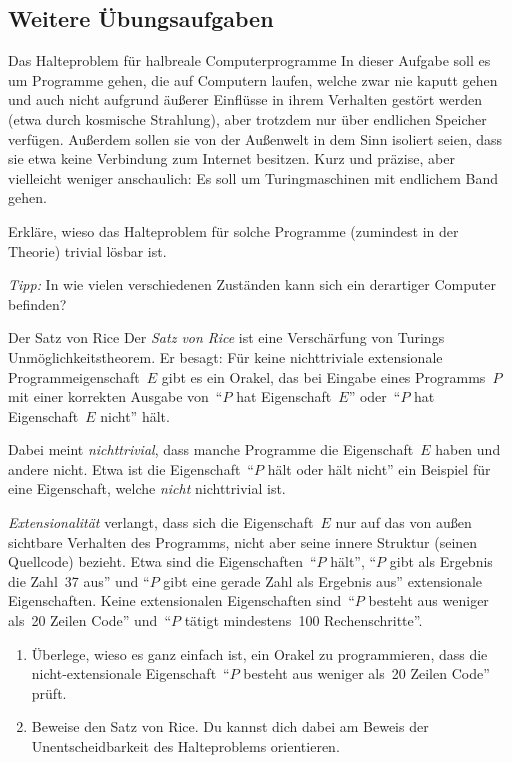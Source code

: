 \documentclass[twoside]{../zirkelblatt1415}
\theoremstyle{definition}
\theoremstyle{plain}
\theoremstyle{remark}
\begin{document}
\subsection{Weitere Übungsaufgaben}

\begin{aufgabe}{Das Halteproblem für halbreale Computerprogramme}
In dieser Aufgabe soll es um Programme gehen, die auf Computern laufen, welche
zwar nie kaputt gehen und auch nicht aufgrund äußerer Einflüsse in ihrem
Verhalten gestört werden (etwa durch kosmische Strahlung), aber trotzdem nur
über endlichen Speicher verfügen. Außerdem sollen sie von der Außenwelt in dem
Sinn isoliert seien, dass sie etwa keine Verbindung zum Internet besitzen.
Kurz und präzise, aber vielleicht weniger anschaulich: Es soll um
Turingmaschinen mit endlichem Band gehen.

Erkläre, wieso das Halteproblem für solche Programme (zumindest in der
Theorie) trivial lösbar ist.

\emph{Tipp:} In wie vielen verschiedenen Zuständen kann sich ein derartiger
Computer befinden?
\end{aufgabe}

\begin{aufgabe}{Der Satz von Rice}
Der \emph{Satz von Rice} ist eine Verschärfung von Turings
Unmöglichkeitstheorem. Er besagt: Für keine nichttriviale extensionale
Programmeigenschaft~$E$ gibt es ein Orakel, das bei Eingabe
eines Programms~$P$ mit einer korrekten Ausgabe von~"`$P$ hat Eigenschaft~$E$"'
oder~"`$P$ hat Eigenschaft~$E$ nicht"' hält.

Dabei meint \emph{nichttrivial}, dass manche Programme die Eigenschaft~$E$
haben und andere nicht. Etwa ist die Eigenschaft~"`$P$ hält oder hält nicht"'
ein Beispiel für eine Eigenschaft, welche \emph{nicht} nichttrivial ist.

\emph{Extensionalität} verlangt, dass sich die Eigenschaft~$E$ nur auf das von
außen sichtbare Verhalten des Programms, nicht aber seine innere Struktur
(seinen Quellcode) bezieht. Etwa sind die Eigenschaften~"`$P$ hält"',
"`$P$ gibt als Ergebnis die Zahl~37 aus"' und "`$P$ gibt eine gerade Zahl als
Ergebnis aus"' extensionale Eigenschaften. Keine extensionalen Eigenschaften
sind~"`$P$ besteht aus weniger als~20 Zeilen Code"' und~"`$P$ tätigt
mindestens~100 Rechenschritte"'.

\begin{enumerate}
\item Überlege, wieso es ganz einfach ist, ein Orakel zu programmieren, dass
die nicht-extensionale Eigenschaft~"`$P$ besteht aus weniger als~20 Zeilen
Code"' prüft.
\item Beweise den Satz von Rice. Du kannst dich dabei am Beweis der
Unentscheidbarkeit des Halteproblems orientieren.
\end{enumerate}\fixlistspacing
\end{aufgabe}
\end{document}
